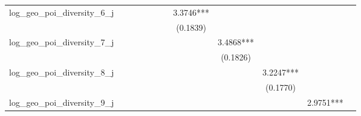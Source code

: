 \begin{table}
\begin{center}
\begin{tabular}{lccccccccccc}
log\_geo\_poi\_diversity\_6\_j  &                       &                        &                         &                          &                           &                            & 3.3746***                   &                              &                               &                                &                                  \\
                                &                       &                        &                         &                          &                           &                            & (0.1839)                    &                              &                               &                                &                                  \\
log\_geo\_poi\_diversity\_7\_j  &                       &                        &                         &                          &                           &                            &                             & 3.4868***                    &                               &                                &                                  \\
                                &                       &                        &                         &                          &                           &                            &                             & (0.1826)                     &                               &                                &                                  \\
log\_geo\_poi\_diversity\_8\_j  &                       &                        &                         &                          &                           &                            &                             &                              & 3.2247***                     &                                &                                  \\
                                &                       &                        &                         &                          &                           &                            &                             &                              & (0.1770)                      &                                &                                  \\
log\_geo\_poi\_diversity\_9\_j  &                       &                        &                         &                          &                           &                            &                             &                              &                               & 2.9751***                      &                                  \\

\end{tabular}
\end{center}
\end{table}
